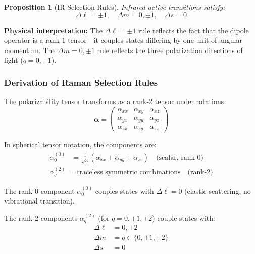 \documentclass[twocolumn,10pt]{article}
\newtheorem{proposition}[theorem]{Proposition}
\theoremstyle{remark}
\begin{document}
\begin{proposition}[IR Selection Rules]
\label{prop:IR_selection}
Infrared-active transitions satisfy:
\begin{equation}
    \Delta \ell = \pm 1, \quad \Delta m = 0, \pm 1, \quad \Delta s = 0
    \label{eq:IR_selection_rules}
\end{equation}
\end{proposition}

\textbf{Physical interpretation:} The $\Delta \ell = \pm 1$ rule reflects the fact that the dipole operator is a rank-1 tensor—it couples states differing by one unit of angular momentum. The $\Delta m = 0, \pm 1$ rule reflects the three polarization directions of light ($q = 0, \pm 1$).

\subsubsection{Derivation of Raman Selection Rules}

The polarizability tensor transforms as a rank-2 tensor under rotations:
\begin{equation}
    \boldsymbol{\alpha} = \begin{pmatrix}
        \alpha_{xx} & \alpha_{xy} & \alpha_{xz} \\
        \alpha_{yx} & \alpha_{yy} & \alpha_{yz} \\
        \alpha_{zx} & \alpha_{zy} & \alpha_{zz}
    \end{pmatrix}
    \label{eq:polarizability_tensor}
\end{equation}

In spherical tensor notation, the components are:
\begin{align}
    \alpha_0^{(0)} &= \frac{1}{\sqrt{3}}(\alpha_{xx} + \alpha_{yy} + \alpha_{zz}) \quad \text{(scalar, rank-0)} \label{eq:alpha_scalar} \\
    \alpha_q^{(2)} &= \text{traceless symmetric combinations} \quad \text{(rank-2)} \label{eq:alpha_rank2}
\end{align}

The rank-0 component $\alpha_0^{(0)}$ couples states with $\Delta \ell = 0$ (elastic scattering, no vibrational transition).

The rank-2 components $\alpha_q^{(2)}$ (for $q = 0, \pm 1, \pm 2$) couple states with:
\begin{align}
    \Delta \ell &= 0, \pm 2 \label{eq:Raman_selection_l} \\
    \Delta m &= q \in \{0, \pm 1, \pm 2\} \label{eq:Raman_selection_m} \\
    \Delta s &= 0 \label{eq:Raman_selection_s}
\end{align}
\end{document}
